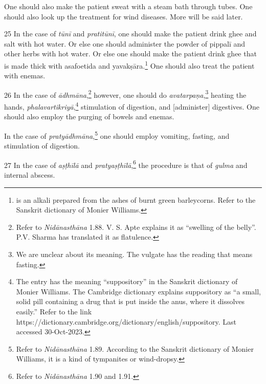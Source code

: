 \begin{translation}
    One should also make the patient sweat with a steam bath through tubes. One should also look up the treatment for wind diseases. More will be said later.

    \item[25]
    In the case of \textit{tūnī} and \textit{pratitūnī}, one should make the patient drink ghee and salt with hot water. Or else one should administer the powder of \gls{pippalī} and other herbs with hot water. Or else one should make the patient drink ghee that is made thick with asafoetida and \gls{yavakṣāra}.\footnote{ is an alkali prepared from the ashes of burnt green barleycorns. Refer to the Sanskrit dictionary of Monier Williams.} One should also treat the patient with enemas. 

    \item[26]
    In the case of \textit{ādhmāna},\footnote{Refer to \textit{Nidānasthāna} 1.88. V. S. Apte explains it as \enquote{swelling of the belly}. P.V. Sharma has translated it as flatulence.} however, one should do \textit{avatarpaṇa},\footnote{We are unclear about its meaning. The vulgate has the reading  that means fasting.} heating the hands, \textit{phalavartikriyā},\footnote{The entry  has the meaning \enquote{suppository} in the Sanskrit dictionary of Monier Williams. The Cambridge dictionary explains suppository as \enquote{a small, solid pill containing a drug that is put inside the anus, where it dissolves easily.} Refer to the link https://dictionary.cambridge.org/dictionary/english/suppository. Last accessed 30-Oct-2023.} stimulation of digestion, and [administer] digestives. One should also employ the purging of bowels and enemas. 

    In the case of \textit{pratyādhmāna},\footnote{Refer to \textit{Nidānasthāna} 1.89. According to the Sanskrit dictionary of Monier Williams, it is a kind of tympanites or wind-dropsy.} one should employ vomiting, fasting, and stimulation of digestion.

    \item[27]
    In the case of \textit{aṣṭhīlā} and \textit{pratyaṣṭhīlā},\footnote{Refer to \textit{Nidānasthāna} 1.90 and 1.91.} the procedure is that of \textit{gulma} and internal abscess.


\end{translation}
